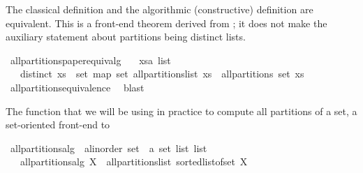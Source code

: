 \begin{isabellebody}
\begin{isamarkuptext}
The classical definition  and the algorithmic (constructive) definition  are equivalent.  This is a front-end theorem derived from
  ; it does not make the auxiliary statement about partitions
  being distinct lists.%
\end{isamarkuptext}%
\isamarkuptrue%
\isamarkupfalse%
\ all{\isacharunderscore}partitions{\isacharunderscore}paper{\isacharunderscore}equiv{\isacharunderscore}alg{\isacharcolon}\isanewline
\ \ \ xs{\isacharcolon}{\isacharcolon}{\isachardoublequoteopen}{\isacharprime}a\ list{\isachardoublequoteclose}\isanewline
\ \ \ {\isachardoublequoteopen}distinct\ xs\ {\isasymLongrightarrow}\ set\ {\isacharparenleft}map\ set\ {\isacharparenleft}all{\isacharunderscore}partitions{\isacharunderscore}list\ xs{\isacharparenright}{\isacharparenright}\ {\isacharequal}\ all{\isacharunderscore}partitions\ {\isacharparenleft}set\ xs{\isacharparenright}{\isachardoublequoteclose}\isanewline
%
\isadelimproof
\ \ %
\endisadelimproof
%
\isatagproof
{}\isamarkupfalse%
\ all{\isacharunderscore}partitions{\isacharunderscore}equivalence{\isacharprime}\ \isamarkupfalse%
\ blast%
\endisatagproof
{\isafoldproof}%
%
\isadelimproof
%
\endisadelimproof
%
\begin{isamarkuptext}%
The function that we will be using in practice to compute all partitions of a set,
  a set-oriented front-end to %
\end{isamarkuptext}%
\isamarkuptrue%
\isamarkupfalse%
\ all{\isacharunderscore}partitions{\isacharunderscore}alg\ {\isacharcolon}{\isacharcolon}\ {\isachardoublequoteopen}{\isacharprime}a{\isasymColon}linorder\ set\ {\isasymRightarrow}\ {\isacharprime}a\ set\ list\ list{\isachardoublequoteclose}\isanewline
\ \ \ {\isachardoublequoteopen}all{\isacharunderscore}partitions{\isacharunderscore}alg\ X\ {\isacharequal}\ all{\isacharunderscore}partitions{\isacharunderscore}list\ {\isacharparenleft}sorted{\isacharunderscore}list{\isacharunderscore}of{\isacharunderscore}set\ X{\isacharparenright}{\isachardoublequoteclose}\isanewline
%
\isadelimtheory
\isanewline
%
\endisadelimtheory
%
\isatagtheory
{}\isamarkupfalse%
%
\endisatagtheory
{\isafoldtheory}%
%
\isadelimtheory
%
\endisadelimtheory
\end{isabellebody}%
